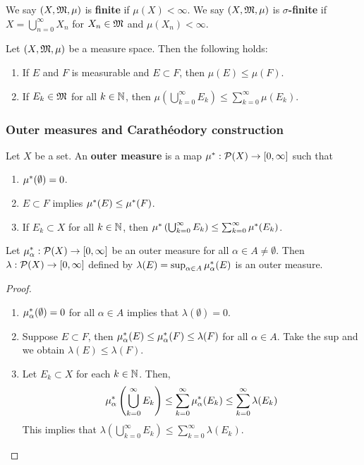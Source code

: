\documentclass[a4paper]{article}
\renewcommand{\cupinfn}{\bigcup_{n=0}^\infty}
\renewcommand{\cupinfk}{\bigcup_{k=0}^\infty}
\renewcommand{\suminfk}{\sum_{k=0}^\infty}
\begin{document}
\begin{defi}
  We say $(X, \mf, \mu)$ is \textbf{finite} if
  $\mu(X) < \infty$. We say $(X, \mf, \mu)$ is
  \textbf{$\sigma$-finite} if $X = \cupinfn X_n$ for
  $X_n \in \mf$ and $\mu(X_n) < \infty$.
\end{defi}

\begin{thm}
  Let $(X, \mf, \mu)$ be a measure space. Then the
  following holds:
  \begin{enumerate}
    \item If $E$ and $F$ is measurable and $E \subset F$,
    then $\mu(E) \leq \mu(F)$.

    \item If $E_k \in \mf$ for all $k \in \N$, then
    $\mu \left( \cupinfk E_k \right) \leq \suminfk \mu(E_k)$.
  \end{enumerate}
\end{thm}

\subsubsection{Outer measures and Carath\'eodory construction}

\begin{defi}
  Let $X$ be a set. An \textbf{outer measure} is a map
  $\om: \P(X) \to [0, \infty]$ such that
  \begin{enumerate}
    \item $\om(\emptyset) = 0$.
    \item $E \subset F$ implies $\om(E) \leq \om(F)$.
    \item If $E_k \subset X$ for all $k \in \N$, then
    $\om \left( \cupinfk E_k \right) \leq \suminfk \om(E_k)$.
  \end{enumerate}
\end{defi}

\begin{prop}
  Let $\om_\alpha: \P(X) \to [0, \infty]$ be an outer
  measure for all $\alpha \in A \neq \emptyset$.
  Then $\lambda: \P(X) \to [0, \infty]$ defined by
  $\lambda(E) = \sup_{\alpha \in A} \om_\alpha(E)$
  is an outer measure.
\end{prop}

\begin{proof}
\begin{enumerate}
  \item $\om_\alpha(\emptyset) = 0$ for all $\alpha \in A$
  implies that $\lambda(\emptyset) = 0$.

  \item Suppose $E \subset F$, then $\om_\alpha(E)
  \leq \om_\alpha(F) \leq \lambda(F)$ for all $\alpha \in A$.
  Take the sup and we obtain $\lambda(E) \leq \lambda(F)$.

  \item Let $E_k \subset X$ for each $k \in \N$.
  Then,
  \[
  \om_\alpha \left( \cupinfk E_k \right)
  \leq \suminfk \om_\alpha (E_k)
  \leq \suminfk \lambda(E_k)
  \]
  This implies that $\lambda(\cupinfk E_k) \leq \suminfk
  \lambda(E_k)$.
\end{enumerate}
\end{proof}
\end{document}
